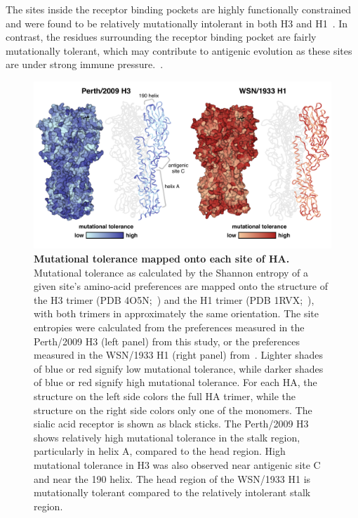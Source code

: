 \documentclass[11pt]{article}
\begin{document}
The sites inside the receptor binding pockets are highly functionally constrained and were found to be relatively mutationally intolerant in both H3 and H1~\citep{wilson1981structure}.
In contrast, the residues surrounding the receptor binding pocket are fairly mutationally tolerant, which may contribute to antigenic evolution as these sites are under strong immune pressure.~\citep{wiley1981structural}.

\begin{figure}
\centerline{\includegraphics[width=\textwidth]{figs/mut_tolerance/entropy_heatmap.pdf}}
\caption{\label{fig:mut_tolerance}
{\bf Mutational tolerance mapped onto each site of HA.}
Mutational tolerance as calculated by the Shannon entropy of a given site's amino-acid preferences are mapped onto the structure of the H3 trimer (PDB 4O5N;~\cite{lee2014receptor}) and the H1 trimer (PDB 1RVX;~\cite{gamblin2004structure}), with both trimers in approximately the same orientation. 
The site entropies were calculated from the preferences measured in the Perth/2009 H3 (left panel) from this study, or the preferences measured in the WSN/1933 H1 (right panel) from~\cite{doud2016accurate}. 
Lighter shades of blue or red signify low mutational tolerance, while darker shades of blue or red signify high mutational tolerance. 
For each HA, the structure on the left side colors the full HA trimer, while the structure on the right side colors only one of the monomers.
The sialic acid receptor is shown as black sticks.
The Perth/2009 H3 shows relatively high mutational tolerance in the stalk region, particularly in helix A, compared to the head region. 
High mutational tolerance in H3 was also observed near antigenic site C and near the 190 helix.
The head region of the WSN/1933 H1 is mutationally tolerant compared to the relatively intolerant stalk region. 
}
\end{figure}
\end{document}
